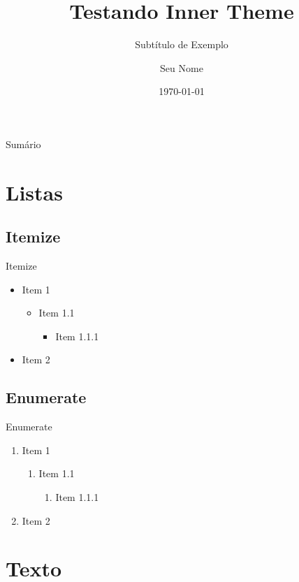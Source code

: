 \documentclass[aspectratio=169]{beamer}
\title{Testando Inner Theme}
\subtitle{Subtítulo de Exemplo}
\author{Seu Nome}
\institute{Sua Instituição}
\date{\today}
\begin{document}
\maketitle

\begin{frame}{Sumário}

\tableofcontents
    
\end{frame}

\section{Listas}

\subsection{Itemize}
\begin{frame}{Itemize}
\begin{itemize}
    \item Item 1
    \begin{itemize}
        \item Item 1.1
        \begin{itemize}
            \item Item 1.1.1
        \end{itemize}
    \end{itemize}
    \item Item 2
\end{itemize}
\end{frame}

\subsection{Enumerate}
\begin{frame}{Enumerate}
\begin{enumerate}
    \item Item 1
    \begin{enumerate}
        \item Item 1.1
        \begin{enumerate}
            \item Item 1.1.1
        \end{enumerate}
    \end{enumerate}
    \item Item 2
\end{enumerate}
\end{frame}

\section{Texto}
\end{document}
